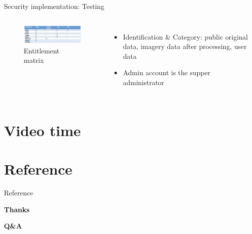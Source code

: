 \documentclass[aspectratio=169]{beamer}
\begin{document}
\begin{frame}[fragile]{Security implementation: Testing}

  \begin{columns}
      \begin{figure}[htbp]
        \centerline{\includegraphics[width=180pt]{images/matrix.png}}
        \caption{Entitlement matrix}
      \end{figure}

      \begin{itemize}
        \item Identification \& Category: public original data, imagery data after processing, user data
        \pause
        \item Admin account is the supper administrator
        
      \end{itemize}
  \end{columns}

\end{frame}

\section{Video time}

\section{Reference}

\begin{frame}[allowframebreaks]{Reference}

   \printbibliography[heading=none]
 
\end{frame}

\begin{frame}{}
  \textbf{Thanks}
  
  \textbf{Q\&A}
\end{frame}
\end{document}
